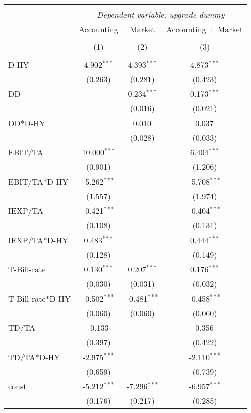 \begin{table}[!htbp] \centering
\begin{tabular}{@{\extracolsep{5pt}}lccc}
\\[-1.8ex]\hline
\hline \\[-1.8ex]
& \multicolumn{3}{c}{\textit{Dependent variable: upgrade-dummy}} \
\cr \cline{2-4}
\\[-1.8ex] & \multicolumn{1}{c}{Accounting} & \multicolumn{1}{c}{Market} & \multicolumn{1}{c}{Accounting + Market}  \\
\\[-1.8ex] & (1) & (2) & (3) \\
\hline \\[-1.8ex]
 D-HY & 4.902$^{***}$ & 4.393$^{***}$ & 4.873$^{***}$ \\
& (0.263) & (0.281) & (0.423) \\
 DD & & 0.234$^{***}$ & 0.173$^{***}$ \\
& & (0.016) & (0.021) \\
 DD*D-HY & & 0.010$^{}$ & 0.037$^{}$ \\
& & (0.028) & (0.033) \\
 EBIT/TA & 10.000$^{***}$ & & 6.404$^{***}$ \\
& (0.901) & & (1.206) \\
 EBIT/TA*D-HY & -5.262$^{***}$ & & -5.708$^{***}$ \\
& (1.557) & & (1.974) \\
 IEXP/TA & -0.421$^{***}$ & & -0.404$^{***}$ \\
& (0.108) & & (0.131) \\
 IEXP/TA*D-HY & 0.483$^{***}$ & & 0.444$^{***}$ \\
& (0.128) & & (0.149) \\
 T-Bill-rate & 0.130$^{***}$ & 0.207$^{***}$ & 0.176$^{***}$ \\
& (0.030) & (0.031) & (0.032) \\
 T-Bill-rate*D-HY & -0.502$^{***}$ & -0.481$^{***}$ & -0.458$^{***}$ \\
& (0.060) & (0.060) & (0.060) \\
 TD/TA & -0.133$^{}$ & & 0.356$^{}$ \\
& (0.397) & & (0.422) \\
 TD/TA*D-HY & -2.975$^{***}$ & & -2.110$^{***}$ \\
& (0.659) & & (0.739) \\
 const & -5.212$^{***}$ & -7.296$^{***}$ & -6.957$^{***}$ \\
& (0.176) & (0.217) & (0.285) \\

\end{tabular}
\end{table}
